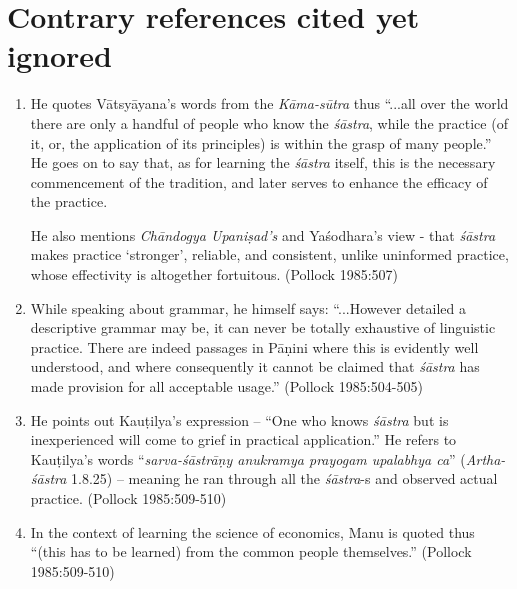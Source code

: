 \section*{Contrary references cited yet ignored}

\begin{enumerate}
\item He quotes Vātsyāyana's words from the {\it Kāma-sūtra} thus ``...all over the world there are only a handful of people who know the {\it śāstra}, while the practice (of it, or, the application of its principles) is within the grasp of many people.'' He goes on to say that, as for learning the {\it śāstra} itself, this is the necessary commencement of the tradition, and later serves to enhance the efficacy of the practice. 

He also mentions \textsl{Chāndogya Upaniṣad's} and Yaśodhara's view - that {\it śāstra} makes practice `stronger', reliable, and consistent, unlike uninformed practice, whose effectivity is altogether fortuitous. (Pollock 1985:507)

\item While speaking about grammar, he himself says: ``...However detailed a descriptive grammar may be, it can never be totally exhaustive of linguistic practice. There are indeed passages in Pāṇini where this is evidently well understood, and where consequently it cannot be claimed that {\it śāstra} has made provision for all acceptable usage.'' (Pollock 1985:504-505)

\item He points out Kauṭilya's expression -- ``One who knows {\it śāstra} but is inexperienced will come to grief in practical application.'' He refers to Kauṭilya's words ``\textsl{sarva-śāstrāṇy anukramya prayogam upalabhya ca}'' (\textsl{Artha-śāstra} 1.8.25) -- meaning he ran through all the {\it śāstra}-s and observed actual practice. (Pollock 1985:509-510)

\item In the context of learning the science of economics, Manu is quoted thus ``(this has to be learned) from the common people themselves.'' (Pollock 1985:509-510)


\end{enumerate}
